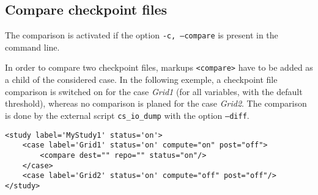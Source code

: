 \documentclass[a4paper,10pt,twoside]{csshortdoc}
\begin{document}
\subsection{Compare checkpoint files}

The comparison is activated if the option \texttt{-c, --compare} is present in
the command line.

In order to compare two checkpoint files, markups \texttt{<compare>} have to
be added as a child of the considered case. In the following exemple, a
checkpoint file comparison is switched on for the case \textit{Grid1} (for all
variables, with the default threshold), whereas no comparison is planed for
the case \textit{Grid2}. The comparison is done by the external
script \texttt{cs\_io\_dump} with the option \texttt{--diff}.

\small
\begin{verbatim}
<study label='MyStudy1' status='on'>
    <case label='Grid1' status='on' compute="on" post="off">
        <compare dest="" repo="" status="on"/>
    </case>
    <case label='Grid2' status='on' compute="off" post="off"/>
</study>
\end{verbatim}
\normalsize
\end{document}
